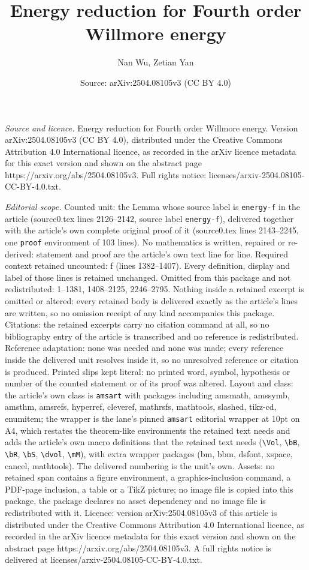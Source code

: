 \documentclass[10pt,a4paper]{amsart}
\title[Energy reduction for Fourth order Willmore energy]{Energy reduction for Fourth order Willmore energy}
\author{Nan Wu, Zetian Yan}
\date{Source: arXiv:2504.08105v3 (CC BY 4.0)}
\begin{document}
\maketitle

\noindent\emph{Source and licence.} Energy reduction for Fourth order Willmore energy. Version arXiv:2504.08105v3 (CC BY 4.0), distributed under the Creative Commons Attribution 4.0 International licence, as recorded in the arXiv licence metadata for this exact version and shown on the abstract page https://arxiv.org/abs/2504.08105v3. Full rights notice: licenses/arxiv-2504.08105-CC-BY-4.0.txt.\par\smallskip

\noindent\textit{Editorial scope.} Counted unit: the Lemma whose source label is \texttt{energy-f} in the article (source0.tex lines 2126--2142, source label \texttt{energy-f}), delivered together with the article's own complete original proof of it (source0.tex lines 2143--2245, one \texttt{proof} environment of 103 lines). No mathematics is written, repaired or re-derived: statement and proof are the article's own text line for line. Required context retained uncounted: f (lines 1382--1407). Every definition, display and label of those lines is retained unchanged. Omitted from this package and not redistributed: 1--1381, 1408--2125, 2246--2795. Nothing inside a retained excerpt is omitted or altered: every retained body is delivered exactly as the article's lines are written, so no omission receipt of any kind accompanies this package. Citations: the retained excerpts carry no citation command at all, so no bibliography entry of the article is transcribed and no reference is redistributed. Reference adaptation: none was needed and none was made; every reference inside the delivered unit resolves inside it, so no unresolved reference or citation is produced. Printed slips kept literal: no printed word, symbol, hypothesis or number of the counted statement or of its proof was altered. Layout and class: the article's own class is \texttt{amsart} with packages including amsmath, amssymb, amsthm, amsrefs, hyperref, cleveref, mathrsfs, mathtools, slashed, tikz-cd, enumitem; the wrapper is the lane's pinned \texttt{amsart} editorial wrapper at 10pt on A4, which restates the theorem-like environments the retained text needs and adds the article's own macro definitions that the retained text needs (\texttt{\textbackslash Vol}, \texttt{\textbackslash bB}, \texttt{\textbackslash bR}, \texttt{\textbackslash bS}, \texttt{\textbackslash dvol}, \texttt{\textbackslash mM}), with extra wrapper packages (bm, bbm, dsfont, xspace, cancel, mathtools). The delivered numbering is the unit's own. Assets: no retained span contains a figure environment, a graphics-inclusion command, a PDF-page inclusion, a table or a TikZ picture; no image file is copied into this package, the package declares no asset dependency and no image file is redistributed with it. Licence: version arXiv:2504.08105v3 of this article is distributed under the Creative Commons Attribution 4.0 International licence, as recorded in the arXiv licence metadata for this exact version and shown on the abstract page https://arxiv.org/abs/2504.08105v3. A full rights notice is delivered at licenses/arxiv-2504.08105-CC-BY-4.0.txt. 
\end{document}
